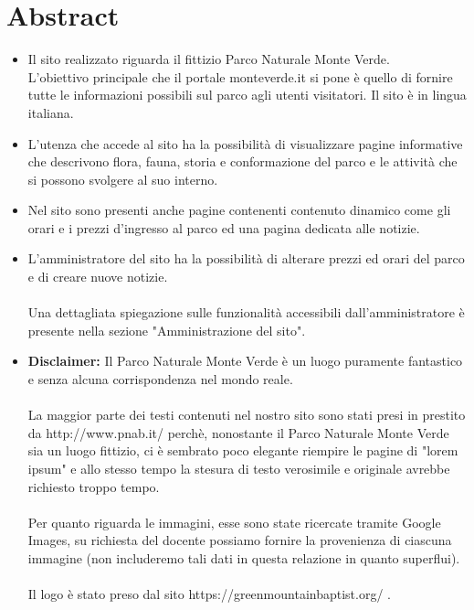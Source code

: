 \documentclass[12pt]{article}
\begin{document}
	\section{Abstract}
	\begin{itemize}
		\item Il sito realizzato riguarda il fittizio Parco Naturale Monte Verde.\\ L'obiettivo principale che il portale monteverde.it si pone \`e quello di fornire tutte le informazioni possibili sul parco agli utenti visitatori. Il sito \`e in lingua italiana.
		
		\item L'utenza che accede al sito ha la possibilit\`a di visualizzare pagine informative che descrivono flora, fauna, storia e conformazione del parco e le attivit\`a che si possono svolgere al suo interno.

		\item Nel sito sono presenti anche pagine contenenti contenuto dinamico come gli orari e i prezzi d'ingresso al parco ed una pagina dedicata alle notizie.

		\item L'amministratore del sito ha la possibilit\`a di alterare prezzi ed orari del parco e di creare nuove notizie.\\ \\ Una dettagliata spiegazione sulle funzionalit\`a accessibili dall'amministratore \`e presente nella sezione "Amministrazione del sito".

		\item \textbf{Disclaimer:} Il Parco Naturale Monte Verde \`e un luogo puramente fantastico e senza alcuna corrispondenza nel mondo reale.\\ \\ La maggior parte dei testi contenuti nel nostro sito sono stati presi in prestito da http://www.pnab.it/ perch\`e, nonostante il Parco Naturale Monte Verde sia un luogo fittizio, ci \`e sembrato poco elegante riempire le pagine di "lorem ipsum" e allo stesso tempo la stesura di testo verosimile e originale avrebbe richiesto troppo tempo.\\ \\ Per quanto riguarda le immagini, esse sono state ricercate tramite Google Images, su richiesta del docente possiamo fornire la provenienza di ciascuna immagine (non includeremo tali dati in questa relazione in quanto superflui).\\ \\ Il logo \`e stato preso dal sito https://greenmountainbaptist.org/ .

	\end{itemize}
\end{document}
